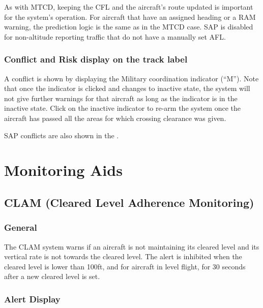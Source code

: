 \documentclass[a4paper,oneside,11pt]{memoir}
\begin{document}
As with MTCD, keeping the CFL and the aircraft’s route updated is important for the system’s operation. For aircraft that have an assigned heading or a RAM warning, the prediction logic is the same as in the MTCD case. SAP is disabled for non-altitude reporting traffic that do not have a manually set AFL.

\subsubsection*{Conflict and Risk display on the track label}

A conflict is shown by displaying the Military coordination indicator (“M”). Note that once the indicator is clicked and changes to inactive state, the system will not give further warnings for that aircraft as long as the indicator is in the inactive state. Click on the inactive indicator to re-arm the system once the aircraft has passed all the areas for which crossing clearance was given.

\bigskip

SAP conflicts are also shown in the .

\section{Monitoring Aids}



\subsection{CLAM (Cleared Level Adherence Monitoring)}
\label{tool:CLAM}
\subsubsection*{General}

The CLAM system warns if an aircraft is not maintaining its cleared level and its vertical rate is not towards the cleared level. The alert is inhibited when the cleared level is lower than 100ft, and for aircraft in level flight, for 30 seconds after a new cleared level is set.

\subsubsection*{Alert Display}
\end{document}
